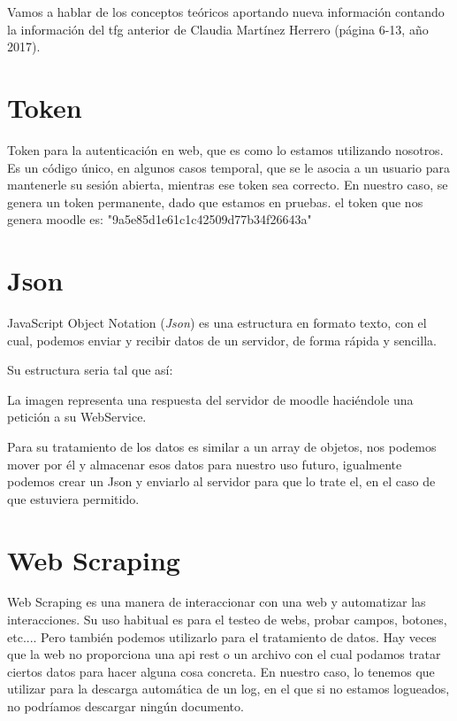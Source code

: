 
Vamos a hablar de los conceptos teóricos aportando nueva información contando la información del tfg anterior de Claudia Martínez Herrero (página 6-13, año 2017). \cite{claudia}




\section{Token}\label{token}

Token para la autenticación en web, que es como lo estamos utilizando nosotros. Es un código único, en algunos casos temporal, que se le asocia a un usuario para mantenerle su sesión abierta, mientras ese token sea correcto. En nuestro caso, se genera un token permanente, dado que estamos en pruebas. el token que nos genera moodle es: "9a5e85d1e61c1c42509d77b34f26643a"

\section{Json}\label{json}

JavaScript Object Notation (\emph{Json}) es una estructura en formato texto, con el cual, podemos enviar y recibir datos de un servidor, de forma rápida y sencilla. 

Su estructura seria tal que así:


La imagen representa una respuesta del servidor de moodle haciéndole una petición a su WebService.

Para su tratamiento de los datos es similar a un array de objetos, nos podemos mover por él y almacenar esos datos para nuestro uso futuro, igualmente podemos crear un Json y enviarlo al servidor para que lo trate el, en el caso de que estuviera permitido.

\section{Web Scraping}\label{web-scraping}

Web Scraping es una manera de interaccionar con una web y automatizar las interacciones. Su uso habitual es para  el testeo de webs, probar campos, botones, etc.... Pero también podemos utilizarlo para el tratamiento de datos. Hay veces que la web no proporciona una api rest o un archivo con el cual podamos tratar ciertos datos para hacer alguna cosa concreta. En nuestro caso, lo tenemos que utilizar para la descarga automática de un log, en el que si no estamos logueados, no podríamos descargar ningún documento.

